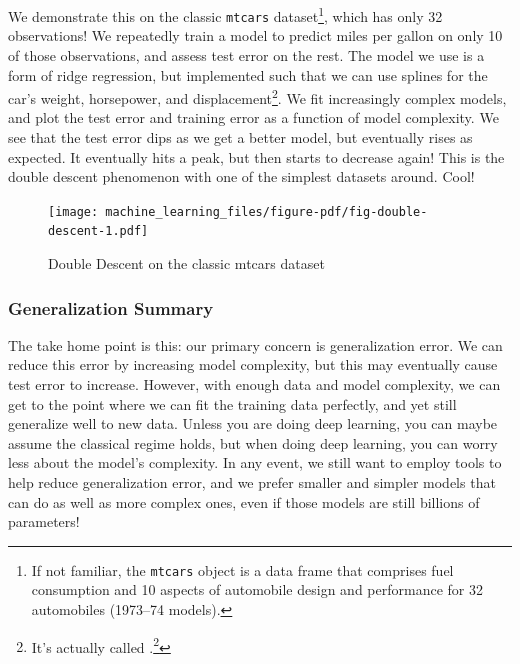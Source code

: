 \documentclass[
  letterpaper,
]{krantz}
\DeclareRobustCommand{\href}[2]{#2\footnote{\url{#1}}}
\begin{document}
We demonstrate this on the classic \texttt{mtcars} dataset\footnote{If
  not familiar, the \texttt{mtcars} object is a data frame that
  comprises fuel consumption and 10 aspects of automobile design and
  performance for 32 automobiles (1973--74 models).}, which has only 32
observations! We repeatedly train a model to predict miles per gallon on
only 10 of those observations, and assess test error on the rest. The
model we use is a form of ridge regression, but implemented such that we
can use splines for the car's weight, horsepower, and
displacement\footnote{It's actually called
  \href{https://www.stat.berkeley.edu/%7Eryantibs/statlearn-s23/lectures/ridgeless.pdf}{\emph{ridgeless}
  regression}.}. We fit increasingly complex models, and plot the test
error and training error as a function of model complexity. We see that
the test error dips as we get a better model, but eventually rises as
expected. It eventually hits a peak, but then starts to decrease again!
This is the double descent phenomenon with one of the simplest datasets
around. Cool!

\begin{figure}

{\centering \texttt{[image: machine\_learning\_files/figure-pdf/fig-double-descent-1.pdf]}

}

\caption{\label{fig-double-descent}Double Descent on the classic mtcars
dataset}

\end{figure}

\subsubsection{Generalization Summary}\label{generalization-summary}

The take home point is this: our primary concern is generalization
error. We can reduce this error by increasing model complexity, but this
may eventually cause test error to increase. However, with enough data
and model complexity, we can get to the point where we can fit the
training data perfectly, and yet still generalize well to new data.
Unless you are doing deep learning, you can maybe assume the classical
regime holds, but when doing deep learning, you can worry less about the
model's complexity. In any event, we still want to employ tools to help
reduce generalization error, and we prefer smaller and simpler models
that can do as well as more complex ones, even if those models are still
billions of parameters!
\end{document}
